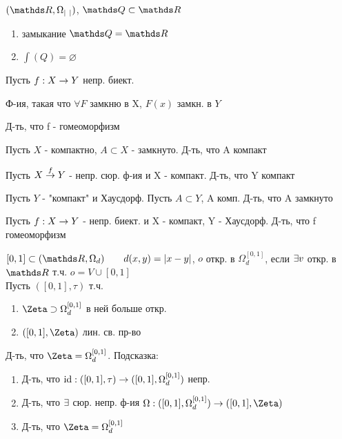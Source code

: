 \documentclass[geometry.tex]{subfiles}
\begin{document}
  \begin{task}
      $(\R, \Omega_{|\ |})$, $\Q \subset \R$
      \begin{enumerate}
        \item замыкание $\Q = \R$
        \item $\int(Q) = \varnothing$
      \end{enumerate}
  \end{task}

  \begin{task}
      Пусть $f: X \rightarrow Y$ непр. биект.

      Ф-ия, такая что $\forall F$ замкню в X, $F(x)$ замкн. в $Y$

      Д-ть, что f - гомеоморфизм
  \end{task}


  \begin{task}[1]
      Пусть $X$ - компактно, $A \subset X$ - замкнуто. Д-ть, что A компакт
  \end{task}

  \begin{task}[2]
      Пусть $X \overset{f}{\rightarrow} Y$ - непр. сюр. ф-ия и X - компакт. Д-ть, что Y компакт
  \end{task}

  \begin{task}[3]
      Пусть $Y$ - "компакт"{} и Хаусдорф. Пусть $A \subset Y$, A комп. Д-ть, что A замкнуто
  \end{task}

  \begin{task}[4]
      Пусть $f: X \rightarrow Y$ - непр. биект. и X - компакт, Y - Хаусдорф. Д-ть, что f гомеоморфизм
  \end{task}

  \begin{task}
      $[0,1] \subset (\R, \Omega_d) \qq d(x,y) = |x-y|$, $o$ откр. в $\Omega_d^{[0,1]}$, если $\exists v$ откр. в $\R$ т.ч. $o = V \cup [0,1]$\\
      Пусть $([0,1], \tau)$ т.ч.
      \begin{enumerate}
        \item $\Zeta \supset \Omega_d^{[0,1]}$ в ней больше откр.
        \item $([0,1], \Zeta)$ лин. св. пр-во
      \end{enumerate}
      Д-ть, что $\Zeta = \Omega_d^{[0,1]}$. Подсказка:
      \begin{enumerate}
        \item Д-ть, что $\mathop{\rm id}\nolimits: ([0,1], \tau) \rightarrow ([0,1], \Omega_d^{[0,1]})$ непр.
        \item Д-ть, что $\exists$ сюр. непр. ф-ия $\Omega: ([0,1], \Omega_d^{[0,1]}) \ra ([0,1], \Zeta)$
        \item Д-ть, что $\Zeta = \Omega_d^{[0,1]}$
      \end{enumerate}
  \end{task}
\end{document}
